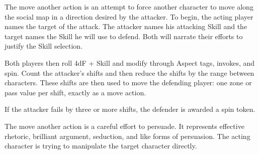 The move another action is an attempt to force another character to move along the social map in a direction desired by the attacker. To begin, the acting player names the target of the attack. The attacker names his attacking Skill and the target names the Skill he will use to defend. Both will narrate their efforts to justify the Skill selection.

Both players then roll 4dF + Skill and modify through Aspect tags, invokes, and spin. Count the attacker's shifts and then reduce the shifts by the range between characters. These shifts are then used to move the defending player: one zone or pass value per shift, exactly as a move action.

If the attacker fails by three or more shifts, the defender is awarded a spin token.

The move another action is a careful effort to persuade. It represents effective rhetoric, brilliant argument, seduction, and like forms of persuasion. The acting character is trying to manipulate the target character directly.

